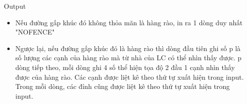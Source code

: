 Output
\begin{itemize}
	\item     Nếu đường gấp khúc đó không thỏa mãn là hàng rào, in ra 1 dòng duy nhất "NOFENCE"   
	\item     Ngược lại, nếu đường gấp khúc đó là hàng rào thì dòng đầu tiên ghi số p là số lượng các cạnh của hàng rào mà từ nhà của LC có thể nhìn thấy được. p dòng tiếp theo, mỗi dòng ghi 4 số thể hiện tọa độ 2 đầu 1 cạnh nhìn thấy được của hàng rào. Các cạnh được liệt kê theo thứ tự xuất hiện trong input. Trong mỗi dòng, các đỉnh cũng được liệt kê theo thứ tự xuất hiện trong input.   
\end{itemize}